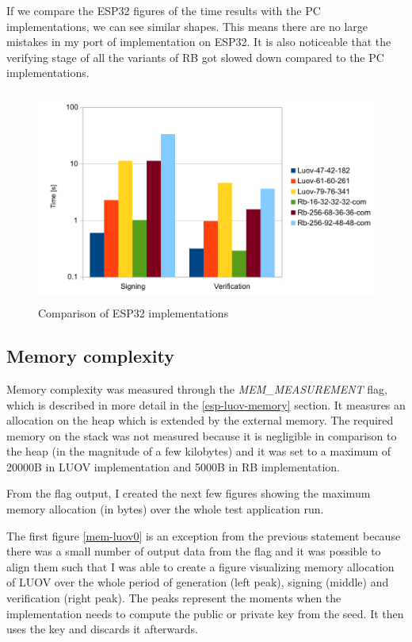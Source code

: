\documentclass[thesis=M,english]{FITthesis}[2019/12/23]
\begin{document}
\bigskip
\noindent
If we compare the ESP32 figures of the time results with the PC implementations, we can see similar shapes. This means there are no large mistakes in my port of implementation on ESP32. It is also noticeable that the verifying stage of all the variants of RB got slowed down compared to the PC implementations.

\begin{figure}[H]
\centering
\includegraphics[width=13cm,height=7cm]{images/time-both.pdf}
\caption{Comparison of ESP32 implementations}
\label{time-both}
\end{figure}

\subsection{Memory complexity}
Memory complexity was measured through the \textit{MEM\_MEASUREMENT} flag, which is described in more detail in the \ref{esp-luov-memory} section. It measures an allocation on the heap which is extended by the external memory. The required memory on the stack was not measured because it is negligible in comparison to the heap (in the magnitude of a few kilobytes) and it was set to a maximum of 20000B in LUOV implementation and 5000B in RB implementation. 

\bigskip
\noindent
From the flag output, I created the next few figures showing the maximum memory allocation (in bytes) over the whole test application run.

\bigskip
\noindent
The first figure \ref{mem-luov0} is an exception from the previous statement because there was a small number of output data from the flag and it was possible to align them such that I was able to create a figure visualizing memory allocation of LUOV over the whole period of generation (left peak), signing (middle) and verification (right peak). The peaks represent the moments when the implementation needs to compute the public or private key from the seed. It then uses the key and discards it afterwards.
\end{document}
